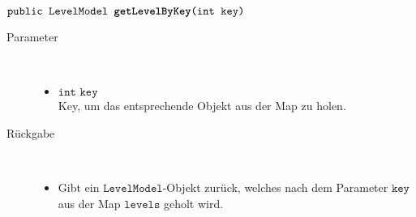 \begin{description}
		\item $\texttt{public LevelModel \textbf{getLevelByKey}(int key)}$ \\ 
		\begin{description}
			\item[Parameter] \hfill \\
			\vspace{-.8cm}
			\begin{itemize}
				\item $\texttt{int key}$ \\ Key, um das entsprechende Objekt aus der Map zu holen.
			\end{itemize}
			\item[Rückgabe] \hfill \\
			\vspace{-.8cm}
			\begin{itemize}
				\item Gibt ein $\texttt{LevelModel}$-Objekt zurück, welches nach dem Parameter $\texttt{key}$ aus der Map $\texttt{levels}$ geholt wird.
			\end{itemize}
			\end{description}
			
	\end{description}

